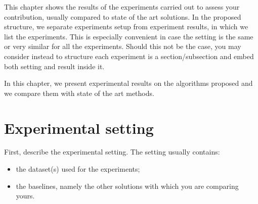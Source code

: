 \iffalse
This chapter shows the results of the experiments carried out to assess your contribution, usually compared to state of the art solutions. In the proposed structure, we separate experiments setup from experiment results, in which we list the experiments. This is especially convenient in case the setting is the same or very similar for all the experiments. Should this not be the case, you may consider instead to structure each experiment is a section/subsection and embed both setting and result inside it.

\begin{example}
In this chapter, we present experimental results on the algorithms proposed and we compare them with state of the art methods.
\end{example}

\section{Experimental setting}

First, describe the experimental setting. The setting usually contains:
\begin{itemize}
\item the dataset(s) used for the experiments;
\item the baselines, namely the other solutions with which you are comparing yours.
\end{itemize}

